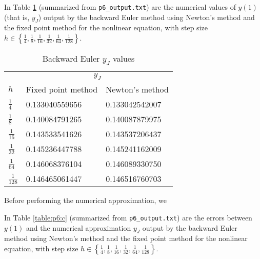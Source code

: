 \documentclass{homework}
\begin{document}
\begin{alphaparts}
		
		
		
		\questionpart 
		In Table \ref{table:p6:b} (summarized from \verb*|p6_output.txt|) are the numerical values of $y(1)$ (that is, $y_J$) output by the backward Euler method using Newton's method and the fixed point method for the nonlinear equation, with step size $h \in \left\{\frac{1}{4}, \frac{1}{8}, \frac{1}{16}, \frac{1}{32}, \frac{1}{64}, \frac{1}{128}\right\}$.
		\begin{table}[H]
			\centering
			\begin{tabular}{@{}lll@{}}
				\toprule
				& \multicolumn{2}{c}{$y_J$} \\
				\cmidrule{2-3}
				$h$ & Fixed point method & Newton's method \\
				\midrule
				$\frac{1}{4}$ & 0.133040559656 & 0.133042542007 \\[0.4em]
				$\frac{1}{8}$ & 0.140084791265 & 0.140087879975 \\[0.4em]
				$\frac{1}{16}$ & 0.143533541626 & 0.143537206437 \\[0.4em]
				$\frac{1}{32}$ & 0.145236447788 & 0.145241162009 \\[0.4em]
				$\frac{1}{64}$ & 0.146068376104 & 0.146089330750 \\[0.4em]
				$\frac{1}{128}$ & 0.146465061447 & 0.146516760703 \\[0.4em]
				\bottomrule
			\end{tabular}
			\caption{Backward Euler $y_J$ values}
			\label{table:p6:b}
		\end{table}
		
		\questionpart
		Before performing the numerical approximation, we 
		
		In Table \ref{table:p6:c} (summarized from \verb*|p6_output.txt|) are the errors between $y(1)$ and the numerical approximation $y_J$ output by the backward Euler method using Newton's method and the fixed point method for the nonlinear equation, with step size $h \in \left\{\frac{1}{4}, \frac{1}{8}, \frac{1}{16}, \frac{1}{32}, \frac{1}{64}, \frac{1}{128}\right\}$.
		

\end{alphaparts}
\end{document}
